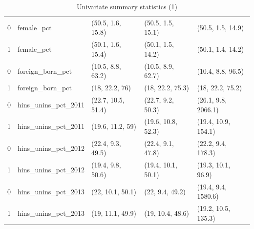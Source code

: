 \documentclass[12pt]{article}
\begin{document}
\begin{table}[ht]
\begin{tabular}{rllll}
  0 & female\_pct & (50.5, 1.6, 15.8) & (50.5, 1.5, 15.1) & (50.5, 1.5, 14.9) \\ 
  1 & female\_pct & (50.1, 1.6, 15.4) & (50.1, 1.5, 14.2) & (50.1, 1.4, 14.2) \\ 
  0 & foreign\_born\_pct & (10.5, 8.8, 63.2) & (10.5, 8.9, 62.7) & (10.4, 8.8, 96.5) \\ 
  1 & foreign\_born\_pct & (18, 22.2, 76) & (18, 22.2, 75.3) & (18, 22.2, 75.2) \\ 
  0 & hins\_unins\_pct\_2011 & (22.7, 10.5, 51.4) & (22.7, 9.2, 50.3) & (26.1, 9.8, 2066.1) \\ 
  1 & hins\_unins\_pct\_2011 & (19.6, 11.2, 59) & (19.6, 10.8, 52.3) & (19.4, 10.9, 154.1) \\ 
  0 & hins\_unins\_pct\_2012 & (22.4, 9.3, 49.5) & (22.4, 9.1, 47.8) & (22.2, 9.4, 178.3) \\ 
  1 & hins\_unins\_pct\_2012 & (19.4, 9.8, 50.6) & (19.4, 10.1, 50.1) & (19.3, 10.1, 96.9) \\ 
  0 & hins\_unins\_pct\_2013 & (22, 10.1, 50.1) & (22, 9.4, 49.2) & (19.4, 9.4, 1580.6) \\ 
  1 & hins\_unins\_pct\_2013 & (19, 11.1, 49.9) & (19, 10.4, 48.6) & (19.2, 10.5, 135.3) \\ 
   \bottomrule
\end{tabular}
    \caption{Univariate summary statistics (1)}
    \label{tab:summarytab1}
\end{table}
\end{document}
